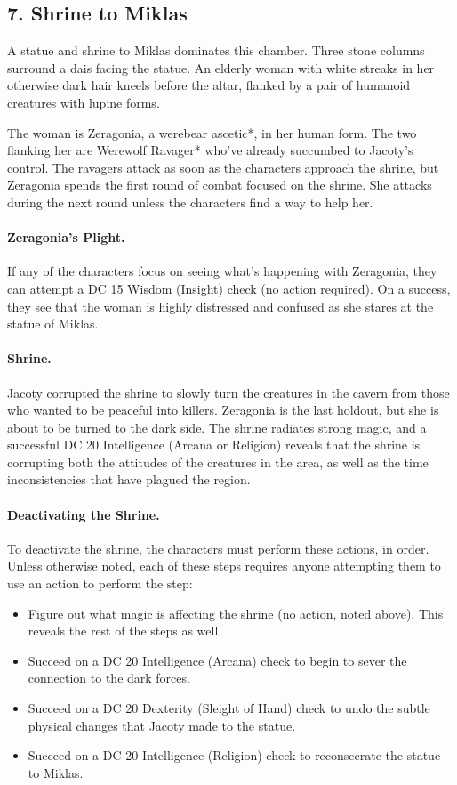 \documentclass[10pt,a4paper,twoside,twocolumn,openany,bg=print,nodeprecatedcode]{dndbook}
\begin{document}
\subsection{7. Shrine to Miklas}
\begin{DndReadAloud}{}
A statue and shrine to Miklas dominates this chamber. Three stone columns surround a dais facing the statue. An elderly woman with white streaks in her otherwise dark hair kneels before the altar, flanked by a pair of humanoid creatures with lupine forms.
\end{DndReadAloud}

The woman is Zeragonia, a werebear ascetic*, in her human form. The two flanking her are Werewolf Ravager* who've already succumbed to Jacoty's control. The ravagers attack as soon as the characters approach the shrine, but Zeragonia spends the first round of combat focused on the shrine. She attacks during the next round unless the characters find a way to help her.
\paragraph{Zeragonia's Plight.}
If any of the characters focus on seeing what's happening with Zeragonia, they can attempt a DC 15 Wisdom (Insight) check (no action required). On a success, they see that the woman is highly distressed and confused as she stares at the statue of Miklas.
\paragraph{Shrine.}
Jacoty corrupted the shrine to slowly turn the creatures in the cavern from those who wanted to be peaceful into killers. Zeragonia is the last holdout, but she is about to be turned to the dark side. The shrine radiates strong magic, and a successful DC 20 Intelligence (Arcana or Religion) reveals that the shrine is corrupting both the attitudes of the creatures in the area, as well as the time inconsistencies that have plagued the region.
\paragraph{Deactivating the Shrine.}
To deactivate the shrine, the characters must perform these actions, in order. Unless otherwise noted, each of these steps requires anyone attempting them to use an action to perform the step:

\begin{itemize}
\item Figure out what magic is affecting the shrine (no action, noted above). This reveals the rest of the steps as well.
\item Succeed on a DC 20 Intelligence (Arcana) check to begin to sever the connection to the dark forces.
\item Succeed on a DC 20 Dexterity (Sleight of Hand) check to undo the subtle physical changes that Jacoty made to the statue.
\item Succeed on a DC 20 Intelligence (Religion) check to reconsecrate the statue to Miklas.
\end{itemize}
\end{document}
